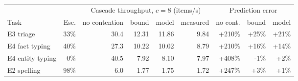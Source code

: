 \begin{tabular}{lrrrrrrrr}
\toprule
 & & \multicolumn{4}{c}{Cascade throughput, $c=8$ (items/s)} & \multicolumn{3}{c}{Prediction error} \\
\cmidrule(lr){3-6}\cmidrule(lr){7-9}
Task & Esc. & no contention & bound & model & measured & no cont. & bound & model \\
\midrule
E3 triage & 33\% & 30.4 & 12.31 & 11.86 & 9.84 & +210\% & +25\% & +21\% \\
E4 fact typing & 40\% & 27.3 & 10.22 & 10.02 & 8.79 & +210\% & +16\% & +14\% \\
E4 entity typing & 0\% & 40.5 & 7.92 & 8.10 & 7.97 & +408\% & -1\% & +2\% \\
E2 spelling & 98\% & 6.0 & 1.77 & 1.75 & 1.72 & +247\% & +3\% & +1\% \\
\bottomrule
\end{tabular}
